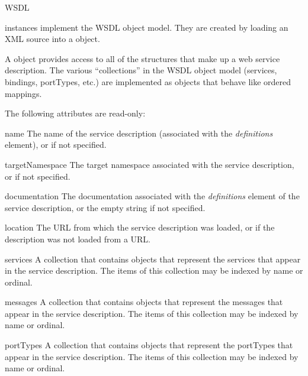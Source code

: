\begin{classdesc}{WSDL}{}

 instances implement the WSDL object model. They are
created by loading an XML source into a  object.

A  object provides access to all of the structures that make 
up a web service description. The various ``collections'' in the WSDL 
object model (services, bindings, portTypes, etc.) are implemented as 
 objects that behave like ordered mappings.

The following attributes are read-only:

\begin{memberdesc}{name}
The name of the service description (associated with the \emph{definitions} 
element), or  if not specified.
\end{memberdesc}

\begin{memberdesc}{targetNamespace}
The target namespace associated with the service description, or 
 if not specified.
\end{memberdesc}

\begin{memberdesc}{documentation}
The documentation associated with the \emph{definitions} element of the 
service description, or the empty string if not specified.
\end{memberdesc}

\begin{memberdesc}{location}
The URL from which the service description was loaded, or  
if the description was not loaded from a URL.
\end{memberdesc}

\begin{memberdesc}{services}
A collection that contains  objects that represent the 
services that appear in the service description. The items of this 
collection may be indexed by name or ordinal. 
\end{memberdesc}

\begin{memberdesc}{messages}
A collection that contains  objects that represent the 
messages that appear in the service description. The items of this 
collection may be indexed by name or ordinal. 
\end{memberdesc}

\begin{memberdesc}{portTypes}
A collection that contains  objects that represent the 
portTypes that appear in the service description. The items of this 
collection may be indexed by name or ordinal. 
\end{memberdesc}


\end{classdesc}
